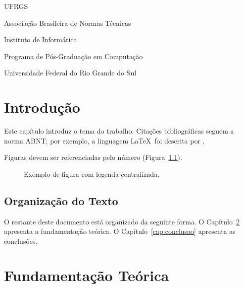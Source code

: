 \documentclass[ppgc,diss,english]{infufrgs}
\begin{document}
\listoffigures

\listoftables

\begin{listofabbrv}{UFRGS}
  \item[ABNT] Associação Brasileira de Normas Técnicas
  \item[INF]  Instituto de Informática
  \item[PPGC] Programa de Pós-Graduação em Computação
  \item[UFRGS] Universidade Federal do Rio Grande do Sul
\end{listofabbrv}



\chapter{Introdução}

Este capítulo introduz o tema do trabalho.  Citações bibliográficas seguem a
norma ABNT; por exemplo, a linguagem \LaTeX\ foi descrita por
\cite{lamport1994latex}.

Figuras devem ser referenciadas pelo número (Figura~\ref{fig:exemplo}).

\begin{figure}[htbp]
  \centering
  \fbox{\rule{0pt}{4cm}\rule{6cm}{0pt}}
  \caption{Exemplo de figura com legenda centralizada.}
  \label{fig:exemplo}
\end{figure}

\section{Organização do Texto}

O restante deste documento está organizado da seguinte forma.  O
Capítulo~\ref{cap:fundamentacao} apresenta a fundamentação teórica.
O Capítulo~\ref{cap:conclusao} apresenta as conclusões.

\chapter{Fundamentação Teórica}
\label{cap:fundamentacao}
\end{document}

